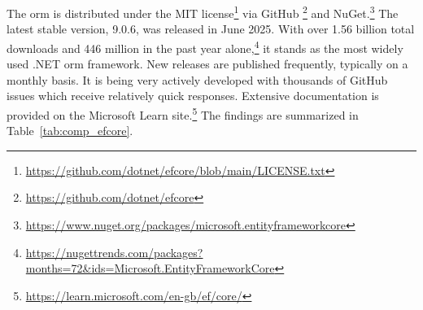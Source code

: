 The \acrshort{orm} is distributed under the MIT license\footnote{\url{https://github.com/dotnet/efcore/blob/main/LICENSE.txt}} via GitHub \footnote{\url{https://github.com/dotnet/efcore}} and NuGet.\footnote{\url{https://www.nuget.org/packages/microsoft.entityframeworkcore}} The latest stable version, 9.0.6, was released in June 2025. With over 1.56 billion total downloads and 446 million in the past year alone,\footnote{\url{https://nugettrends.com/packages?months=72&ids=Microsoft.EntityFrameworkCore}} it stands as the most widely used .NET \acrshort{orm} framework. New releases are published frequently, typically on a monthly basis. It is being very actively developed with thousands of GitHub issues which receive relatively quick responses. Extensive documentation is provided on the Microsoft Learn site.\footnote{\url{https://learn.microsoft.com/en-gb/ef/core/}} The findings are summarized in Table~\ref{tab:comp_efcore}.

